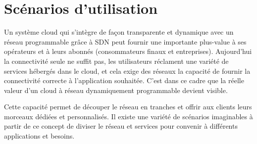 
\section{Scénarios d'utilisation}

Un système cloud qui s'intègre de façon transparente et dynamique avec un réseau programmable grâce à SDN peut fournir une importante plus-value à ses opérateurs et à leurs abonnés (consommateurs finaux et entreprises). Aujourd'hui la connectivité seule ne suffit pas, les utilisateurs réclament une variété de services hébergés dans le cloud, et cela exige des réseaux la capacité de fournir la connectivité correcte à l'application souhaitée. C'est dans ce cadre que  la réelle valeur d'un cloud à réseau dynamiquement programmable  devient visible.

Cette capacité permet de découper le réseau en tranches et offrir aux clients leurs morceaux dédiées et personnalisés. Il existe une variété de scénarios imaginables  à partir de ce concept de diviser le réseau et services pour convenir à différents applications et besoins.


